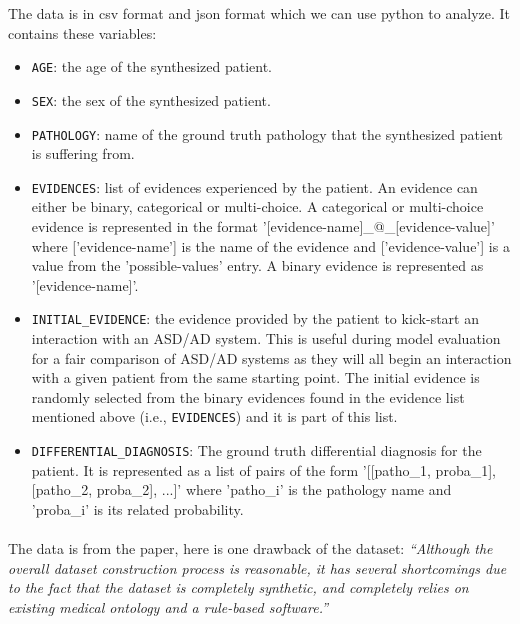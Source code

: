 \documentclass{article}
\begin{document}
The data is in csv format and json format which we can use python to analyze. It contains these variables:
\renewcommand{\labelitemi}{\labelitemii}
\begin{itemize}

\item \verb|AGE|: the age of the synthesized patient.

\item \verb|SEX|: the sex of the synthesized patient.

\item \verb|PATHOLOGY|: name of the ground truth pathology that the synthesized patient is suffering from.

\item \verb|EVIDENCES|: list of evidences experienced by the   patient. An evidence can either be binary, categorical or multi-choice. A categorical or multi-choice evidence is represented in the format '[evidence-name]\_@\_[evidence-value]' where ['evidence-name'] is the name of the evidence and ['evidence-value'] is a value from the 'possible-values' entry. A binary evidence is represented as '[evidence-name]'.

\item \verb|INITIAL_EVIDENCE|: the evidence provided by the patient to kick-start an interaction with an ASD/AD system. This is useful during model evaluation for a fair comparison of ASD/AD systems as they will all begin an interaction with a given patient from the same starting point. The initial evidence is randomly selected from the binary evidences found in the evidence list mentioned above (i.e., \verb|EVIDENCES|) and it is part of this list.

\item \verb|DIFFERENTIAL_DIAGNOSIS|: The ground truth differential diagnosis for the patient. It is represented as a list of pairs of the form '[[patho\_1, proba\_1], [patho\_2, proba\_2],
...]' where 'patho\_i' is the pathology name and 'proba\_i' is its related probability.

\end{itemize}
\paragraph{ }
The data is from the paper, here is one drawback of the dataset:
\textit{“Although the overall dataset construction process is reasonable, it has several shortcomings due to the fact that the dataset is completely synthetic, and completely relies on existing medical ontology and a rule-based software.”}
\end{document}

